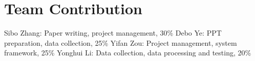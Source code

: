 \section{Team Contribution}
Sibo Zhang: Paper writing, project management, 30\% \newline
Debo Ye: PPT preparation, data collection, 25\% \newline
Yifan Zou: Project management, system framework, 25\% \newline
Yonghui Li: Data collection, data processing and testing, 20\% 
